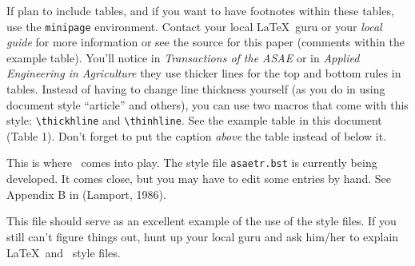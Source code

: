 If plan to include tables, and if you want to have
footnotes within these tables, use the \verb#minipage# environment.
Contact your local \LaTeX\ guru or your {\em local guide} for
more information or see the source for this paper (comments within the
example table).
You'll notice in {\em Transactions of the ASAE} or in {\em Applied
Engineering in Agriculture} they use thicker lines for the top and
bottom rules in tables. Instead of having to change line thickness
yourself (as you do in using document style ``article'' and others),
you can use two macros that come with this style: \verb#\thickhline#
and \verb#\thinhline#.  See the example table in this document (Table 1).
Don't forget to put the caption {\em above} the table instead of below
it.


This is where \BiBTeX\ comes into play.  The style file {\tt asaetr.bst}
is currently being developed. It comes close, but you may have
to edit some entries by hand. See Appendix B in (Lamport, 1986).


This file should serve as an excellent example of the use
of the style files.  If you still can't figure things out, hunt
up your local guru and ask him/her to explain \LaTeX\ and \BiBTeX\
style files.

%










